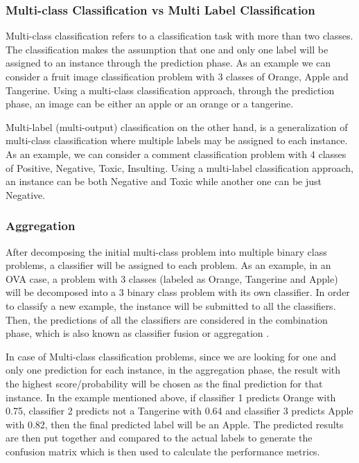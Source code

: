 \subsubsection{Multi-class Classification vs Multi Label Classification}
Multi-class classification refers to a classification task with more than two classes. The 
classification makes the assumption that one and only one label will be assigned to an instance  
through the prediction phase. As an example we can consider a fruit image classification problem 
with 3 classes of Orange, Apple and Tangerine. Using a multi-class classification approach, 
through the prediction phase, an image can be either an apple or an orange or a tangerine.
 
Multi-label (multi-output) classification on the other hand, is a generalization of multi-class 
classification where multiple labels may be assigned to each instance. As an example, we can 
consider a comment classification problem with 4 classes of Positive, Negative, Toxic, Insulting. 
Using a multi-label classification approach, an instance can be both Negative and Toxic 
while another one can be just Negative.

\subsubsection{Aggregation}
After decomposing the initial multi-class problem into multiple binary class problems, a classifier 
will be assigned to each problem. As an example, in an OVA case, a problem with 3 classes 
(labeled as Orange, Tangerine and Apple) will be decomposed into a 3 binary class problem with its 
own classifier.  In order to classify a new example, the instance will be submitted to all the 
classifiers. Then, the predictions of all the classifiers are considered in the combination phase, 
which is also known as classifier fusion or aggregation \cite{wozniak2014survey}.

In case of Multi-class classification problems, since we are looking for one and only one prediction 
for each instance, in the aggregation phase, the result with the highest score/probability will 
be chosen as the final prediction for that instance. In the example mentioned above,  if 
classifier 1 predicts Orange with 0.75, classifier 2 predicts not a Tangerine with 0.64 and 
classifier 3 predicts Apple with 0.82, then the final predicted label will be an Apple. The 
predicted results are then put together and compared to the actual labels to generate the 
confusion matrix which is then used to calculate the performance metrics.

